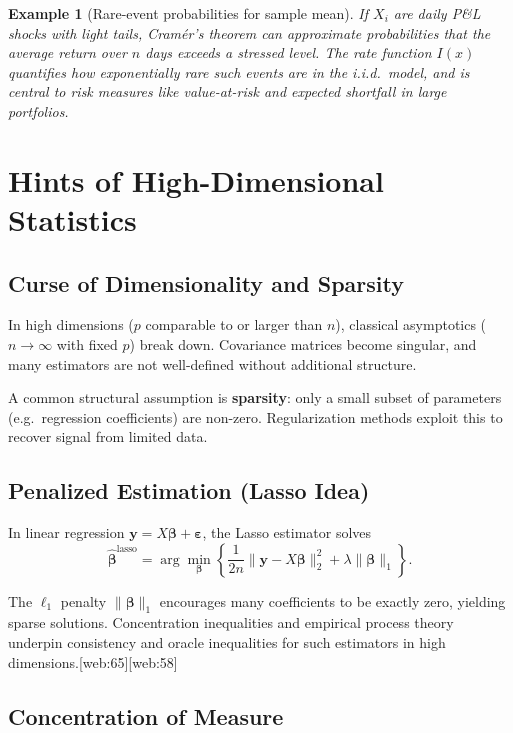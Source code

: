 \documentclass[11pt,a4paper]{article}
\newtheorem{example}{Example}[section]
\numberwithin{equation}{section}
\begin{document}
\begin{example}[Rare-event probabilities for sample mean]
If $X_i$ are daily P\&L shocks with light tails, Cram\'er's theorem can approximate probabilities that the average return over $n$ days exceeds a stressed level. 
The rate function $I(x)$ quantifies how exponentially rare such events are in the i.i.d.\ model, and is central to risk measures like value-at-risk and expected shortfall in large portfolios.

\end{example}

\newpage

\section{Hints of High-Dimensional Statistics}
\label{sec:high-dim}

\subsection{Curse of Dimensionality and Sparsity}

In high dimensions ($p$ comparable to or larger than $n$), classical asymptotics ($n\to\infty$ with fixed $p$) break down. 
Covariance matrices become singular, and many estimators are not well-defined without additional structure.

A common structural assumption is \textbf{sparsity}: only a small subset of parameters (e.g.\ regression coefficients) are non-zero. 
Regularization methods exploit this to recover signal from limited data.

\subsection{Penalized Estimation (Lasso Idea)}

In linear regression $\bm{y}=X\bm{\beta} + \bm{\varepsilon}$, the Lasso estimator solves
\[
\hat{\bm{\beta}}^{\text{lasso}}
= \arg\min_{\bm{\beta}}
\left\{
\frac{1}{2n}\|\bm{y}-X\bm{\beta}\|_2^2
+ \lambda \|\bm{\beta}\|_1
\right\}.
\]

The $\ell_1$ penalty $\|\bm{\beta}\|_1$ encourages many coefficients to be exactly zero, yielding sparse solutions. 
Concentration inequalities and empirical process theory underpin consistency and oracle inequalities for such estimators in high dimensions.[web:65][web:58]

\subsection{Concentration of Measure}
\end{document}
